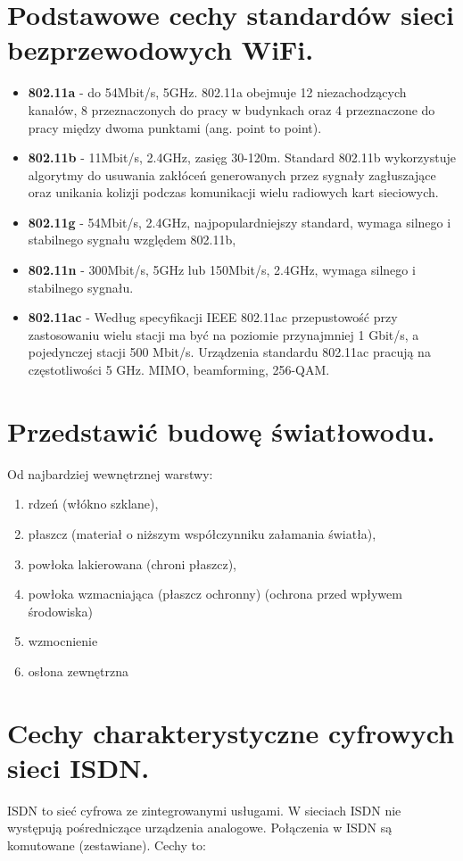 \documentclass[12pt,a4paper]{article}
\begin{document}
	\section{Podstawowe cechy standardów sieci bezprzewodowych WiFi.}
	\begin{itemize}
		\item \textbf{802.11a} - do 54Mbit/s, 5GHz. 802.11a obejmuje 12 niezachodzących kanałów, 8 przeznaczonych do pracy w budynkach oraz 4 przeznaczone do pracy między dwoma punktami (ang. point to point). 
		\item \textbf{802.11b} - 11Mbit/s, 2.4GHz, zasięg 30-120m. Standard 802.11b wykorzystuje algorytmy do usuwania zakłóceń generowanych przez sygnały zagłuszające oraz unikania kolizji podczas komunikacji wielu radiowych kart sieciowych.
		\item \textbf{802.11g} - 54Mbit/s, 2.4GHz, najpopulardniejszy standard, wymaga silnego i stabilnego sygnału względem 802.11b,
		\item \textbf{802.11n} - 300Mbit/s, 5GHz lub 150Mbit/s, 2.4GHz, wymaga silnego i stabilnego sygnału.
		\item \textbf{802.11ac} - Według specyfikacji IEEE 802.11ac przepustowość przy zastosowaniu wielu stacji ma być na poziomie przynajmniej 1 Gbit/s, a pojedynczej stacji 500 Mbit/s. Urządzenia standardu 802.11ac pracują na częstotliwości 5 GHz. MIMO, beamforming, 256-QAM.
	\end{itemize}

	\section{Przedstawić budowę światłowodu.}
	Od najbardziej wewnętrznej warstwy:	
	\begin{enumerate}
		\item rdzeń (włókno szklane), 
		\item płaszcz (materiał o niższym współczynniku załamania światła), 
		\item powłoka lakierowana (chroni płaszcz), 
		\item powłoka wzmacniająca (płaszcz ochronny) (ochrona przed wpływem środowiska)
		\item wzmocnienie
		\item osłona zewnętrzna
	\end{enumerate}

	\section{Cechy charakterystyczne cyfrowych sieci ISDN.}
	ISDN to sieć cyfrowa ze zintegrowanymi usługami. W sieciach ISDN nie występują pośredniczące urządzenia analogowe. Połączenia w ISDN są komutowane (zestawiane). Cechy to:
	
\end{document}
